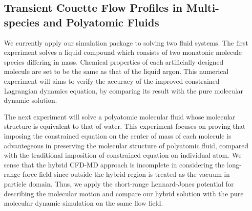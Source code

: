 \documentclass[]{aiaa-tc}%
\begin{document}




\subsection{Transient Couette Flow Profiles in Multi-species and Polyatomic Fluids}
\label{sec:result_multi}

We currently apply our simulation package to solving two fluid systems.
The first experiment solves a liquid compound which consists of two
monatonic molecule species differing in mass. Chemical properties of
each artificially designed molecule are set to be the same as that of
the liquid argon. This numerical experiment will aims to verify the
accuracy of the improved constrained Lagrangian dynamics equation, by comparing its result with the pure molecular dynamic solution.


The next experiment will solve a polyatomic molecular fluid whose
molecular structure is equivalent to that of water. This experiment 
focuses on proving that imposing the constrained equation on the center
of mass of each molecule is advantegeous in preserving the molecular
structure of polyatomic fluid, compared with the traditional imposition
of constrained equation on individual atom. We sense that the hybrid
CFD-MD approach is incomplete in considering the long-range force field
since outside the hybrid region is treated as the vacuum in particle
domain. Thus, we apply the short-range Lennard-Jones potential for
describing the molecular motion and compare our hybrid solution with
the pure molecular dynamic simulation on the same flow field.
\end{document}
